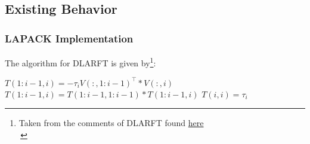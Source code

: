 \documentclass[12pt]{beamer}
\begin{document}
    \subsection{Existing Behavior}
    \begin{frame}
        \frametitle{LAPACK Implementation}
        The algorithm for DLARFT is given by\footnote{Taken from the comments of DLARFT found \textcolor{blue}{\href{https://netlib.org/lapack/explore-html//dd/daa/dlarft_8f_source.html}{here}}\\\,}:
        \begin{algorithmic}[1]
                \State $T(1:i-1,i) = -\tau_i V(:,1:i-1)^\top * V(:,i)$
                \State $T(1:i-1,i) = T(1:i-1,1:i-1) * T(1:i-1,i)$
                \State $T(i,i) = \tau_i$
            \EndFor
        \end{algorithmic}

    \end{frame}
\end{document}
